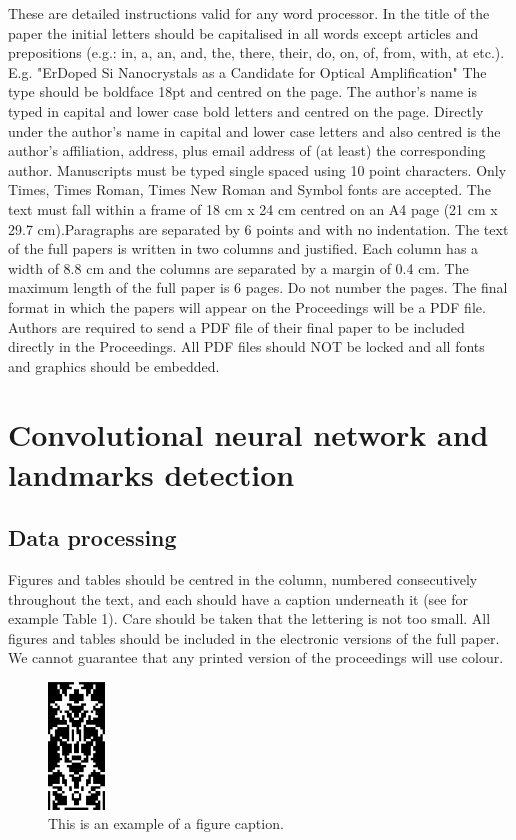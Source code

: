 \documentclass[10pt]{article}
\begin{document}
These are detailed instructions valid for any word
processor. In the title of the paper the initial letters should be
capitalised in all words except articles and prepositions (e.g.:
in, a, an, and, the, there, their, do, on, of, from, with, at etc.).
E.g. "ErDoped Si Nanocrystals as a Candidate for Optical
Amplification" The type should be boldface 18pt and centred
on the page. The author’s name is typed in capital and lower
case bold letters and centred on the page. Directly under the
author’s name in capital and lower case letters and also
centred is the author’s affiliation, address, plus email
address of (at least) the corresponding author. Manuscripts must be
typed single spaced using 10 point characters. Only Times,
Times Roman, Times New Roman and Symbol fonts are
accepted. The text must fall within a frame of 18 cm x 24 cm
centred on an A4 page (21 cm x 29.7 cm).Paragraphs are
separated by 6 points and with no indentation. The text of the
full papers is written in two columns and justified. Each
column has a width of 8.8 cm and the columns are separated
by a margin of 0.4 cm. The maximum length of the full paper
is 6 pages. Do not number the pages. The final format in
which the papers will appear on the Proceedings will be a
PDF file. Authors are required to send a PDF file of their
final paper to be included directly in the Proceedings. All
PDF files should NOT be locked and all fonts and
graphics should be embedded.

\section{Convolutional neural network and landmarks detection}
\subsection{Data processing}
Figures and tables should be centred in the column, numbered
consecutively throughout the text, and each should have a
caption underneath it (see for example Table 1). Care should
be taken that the lettering is not too small. All figures and
tables should be included in the electronic versions of the full
paper. We cannot guarantee that any printed version of the
proceedings will use colour.


\begin{figure}[h]
\centering
\includegraphics[width=1.5cm]{images/fig1}
\caption{\label{tab1}This is an example of a figure caption.} 
\end{figure}
\end{document}
